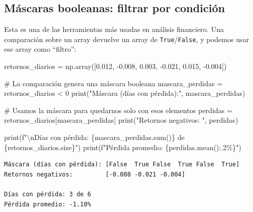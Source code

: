 \documentclass[
  spanish,
  letterpaper,
  DIV=11,
  numbers=noendperiod]{scrreprt}
\newenvironment{Shaded}{\begin{snugshade}}{\end{snugshade}}
\newcommand{\BuiltInTok}[1]{\textcolor[rgb]{0.00,0.23,0.31}{#1}}
\newcommand{\CharTok}[1]{\textcolor[rgb]{0.13,0.47,0.30}{#1}}
\newcommand{\CommentTok}[1]{\textcolor[rgb]{0.37,0.37,0.37}{#1}}
\newcommand{\DecValTok}[1]{\textcolor[rgb]{0.68,0.00,0.00}{#1}}
\newcommand{\FloatTok}[1]{\textcolor[rgb]{0.68,0.00,0.00}{#1}}
\newcommand{\NormalTok}[1]{\textcolor[rgb]{0.00,0.23,0.31}{#1}}
\newcommand{\OperatorTok}[1]{\textcolor[rgb]{0.37,0.37,0.37}{#1}}
\newcommand{\SpecialCharTok}[1]{\textcolor[rgb]{0.37,0.37,0.37}{#1}}
\newcommand{\SpecialStringTok}[1]{\textcolor[rgb]{0.13,0.47,0.30}{#1}}
\newcommand{\StringTok}[1]{\textcolor[rgb]{0.13,0.47,0.30}{#1}}
\begin{document}
\subsection{Máscaras booleanas: filtrar por
condición}\label{muxe1scaras-booleanas-filtrar-por-condiciuxf3n}

Esta es una de las herramientas más usadas en análisis financiero. Una
comparación sobre un array devuelve un array de
\texttt{True}/\texttt{False}, y podemos usar ese array como ``filtro'':

\label{mascaras}
\begin{Shaded}
\begin{Highlighting}[]
\NormalTok{retornos\_diarios }\OperatorTok{=}\NormalTok{ np.array([}\FloatTok{0.012}\NormalTok{, }\OperatorTok{{-}}\FloatTok{0.008}\NormalTok{, }\FloatTok{0.003}\NormalTok{, }\OperatorTok{{-}}\FloatTok{0.021}\NormalTok{, }\FloatTok{0.015}\NormalTok{, }\OperatorTok{{-}}\FloatTok{0.004}\NormalTok{])}

\CommentTok{\# La comparación genera una máscara booleana}
\NormalTok{mascara\_perdidas }\OperatorTok{=}\NormalTok{ retornos\_diarios }\OperatorTok{\textless{}} \DecValTok{0}
\BuiltInTok{print}\NormalTok{(}\StringTok{"Máscara (días con pérdida):"}\NormalTok{, mascara\_perdidas)}

\CommentTok{\# Usamos la máscara para quedarnos solo con esos elementos}
\NormalTok{perdidas }\OperatorTok{=}\NormalTok{ retornos\_diarios[mascara\_perdidas]}
\BuiltInTok{print}\NormalTok{(}\StringTok{"Retornos negativos:        "}\NormalTok{, perdidas)}

\BuiltInTok{print}\NormalTok{(}\SpecialStringTok{f"}\CharTok{\textbackslash{}n}\SpecialStringTok{Días con pérdida: }\SpecialCharTok{\{}\NormalTok{mascara\_perdidas}\SpecialCharTok{.}\BuiltInTok{sum}\NormalTok{()}\SpecialCharTok{\}}\SpecialStringTok{ de }\SpecialCharTok{\{}\NormalTok{retornos\_diarios}\SpecialCharTok{.}\NormalTok{size}\SpecialCharTok{\}}\SpecialStringTok{"}\NormalTok{)}
\BuiltInTok{print}\NormalTok{(}\SpecialStringTok{f"Pérdida promedio: }\SpecialCharTok{\{}\NormalTok{perdidas}\SpecialCharTok{.}\NormalTok{mean()}\SpecialCharTok{:.2\%\}}\SpecialStringTok{"}\NormalTok{)}
\end{Highlighting}
\end{Shaded}

\begin{verbatim}
Máscara (días con pérdida): [False  True False  True False  True]
Retornos negativos:         [-0.008 -0.021 -0.004]

Días con pérdida: 3 de 6
Pérdida promedio: -1.10%
\end{verbatim}
\end{document}
